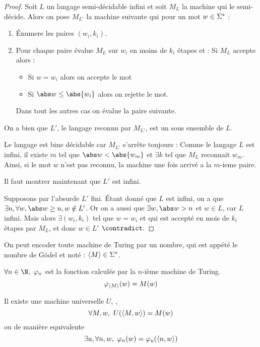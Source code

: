 \begin{proof}
	Soit $L$ un langage semi-décidable infini et soit $M_L$ la machine qui le semi-décide. Alors
	on pose $M_{L'}$ la machine suivante qui pour un mot $w \in \Sigma^{*}$ :
	\begin{enumerate}
		\item Énumere les paires $(w_i,k_i)$.
		\item Pour chaque paire évalue $M_L$ sur $w_i$ en moins de $k_i$ étapes et :
		      Si $M_L$ accepte alors :
		      \begin{itemize}
			      \item Si $w = w_i$ alors on accepte le mot
			      \item Si $\abs w \leq \abs {w_i}$ alors on rejette le mot.
		      \end{itemize}
		      Dans tout les autres cas on évalue la paire suivante.
	\end{enumerate}
	On a bien que $L'$, le langage reconnu par $M_{L'}$, est un sous ensemble de $L$.

	Le langage est bine décidable car $M_{L'}$ s'arrête toujours : Comme le langage $L$ est infini, il existe
	$m$ tel que $\abs w < \abs {w_m}$ et $\exists k$ tel que $M_L$ reconnait $w_m$. Ainsi, si le mot $w$ n'est pas reconnu,
	la machine une fois arrivé a la $m$-ieme paire.

	Il faut montrer maintenant que $L'$ est infini.

	Supposons par l'absurde $L'$ fini. Étant donné que $L$ est infini, on a que $\exists n, \forall w, \abs w \geq n, w \notin L'$.
	Or on a aussi que $\exists w, \abs w > n$ et $w \in L$, car $L$ infini. Mais alors $\exists (w_i,k_i)$ tel que $w = w_i$ et qui est
	accepté en mois de $k_i$ étapes par $M_L$, et donc $w \in L'$ $\contradict$.
\end{proof}

On peut encoder toute machine de Turing par un nombre, qui est appété le nombre de Gödel et noté : $\left\langle M\right\rangle \in \Sigma^{*}$.

\begin{definition} \label{def:enum}
	$\forall n \in \N, \ \phi_n$ est la fonction calculée par la $n$-ième machine de Turing.
	$$\varphi_{\left\langle M\right\rangle} (w) = M (w)$$
\end{definition}


\begin{lemma}\label{lem:univ}
	Il existe une machine universelle $U$, \ie, $$\forall M,w, \  U (\left\langle M,w\right\rangle) = M (w)$$
	ou de manière equivalente
	$$\exists u, \forall n,w, \ \varphi_n(w) = \varphi_u(\left\langle n,w\right\rangle)$$
\end{lemma}

